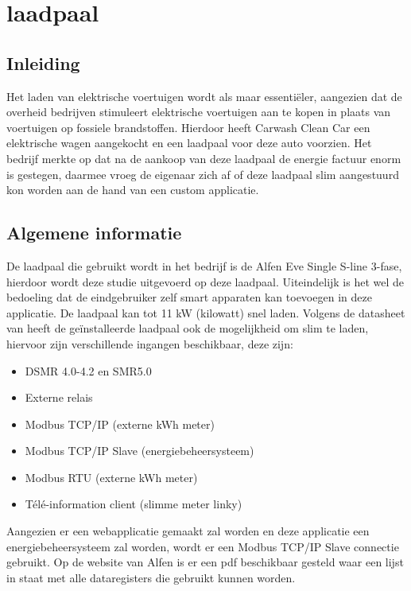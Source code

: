\section{laadpaal}
\label{sec:stand-van-zaken-laadpaal}

\subsection{Inleiding}
\label{sec:stand-van-zaken-laadpaal-inleiding}

Het laden van elektrische voertuigen wordt als maar essentiëler, aangezien dat de overheid bedrijven stimuleert elektrische voertuigen aan te kopen in plaats van voertuigen op fossiele brandstoffen. Hierdoor heeft Carwash Clean Car een elektrische wagen aangekocht en een laadpaal voor deze auto voorzien. Het bedrijf merkte op dat na de aankoop van deze laadpaal de energie factuur enorm is gestegen, daarmee vroeg de eigenaar zich af of deze laadpaal slim aangestuurd kon worden aan de hand van een custom applicatie.

\subsection{Algemene informatie}
\label{sec:stand-van-zaken-laadpaal-algemene-informatie}

De laadpaal die gebruikt wordt in het bedrijf is de Alfen Eve Single S-line 3-fase, hierdoor wordt deze studie uitgevoerd op deze laadpaal. Uiteindelijk is het wel de bedoeling dat de eindgebruiker zelf smart apparaten kan toevoegen in deze applicatie. De laadpaal kan tot 11 kW (kilowatt) snel laden. Volgens de datasheet van \textcite{Alfen2023} heeft de geïnstalleerde laadpaal ook de mogelijkheid om slim te laden, hiervoor zijn verschillende ingangen beschikbaar, deze zijn:

\begin{itemize}
    \item DSMR 4.0-4.2 en SMR5.0
    \item Externe relais
    \item Modbus TCP/IP (externe kWh meter)
    \item Modbus TCP/IP Slave (energiebeheersysteem)
    \item Modbus RTU (externe kWh meter)
    \item Télé-information client (slimme meter linky)
\end{itemize}

Aangezien er een webapplicatie gemaakt zal worden en deze applicatie een energiebeheersysteem zal worden, wordt er een Modbus TCP/IP Slave connectie gebruikt. Op de website van Alfen is er een pdf beschikbaar gesteld waar een lijst in staat met alle dataregisters die gebruikt kunnen worden.

